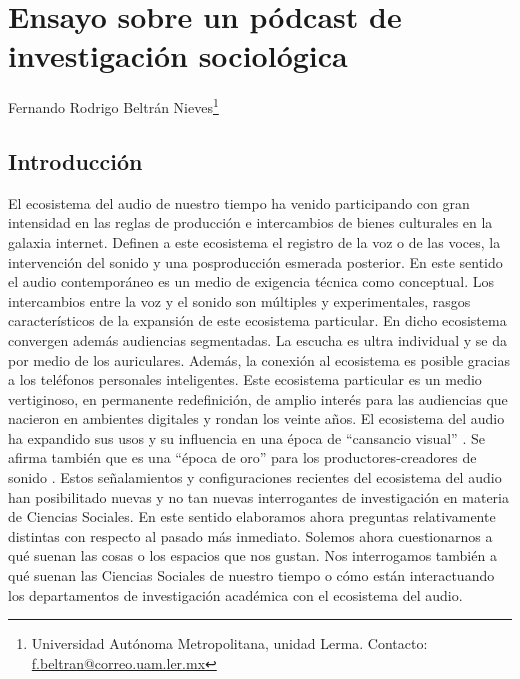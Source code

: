 \documentclass[
  spanish,
  11pt,
  a4paper,
]{scrbook}
\begin{document}
\nocite{Castells1996, RealAcademiaEspanola2014, Bourdieu2009, Bourdieu2011, Becker2019b, Jablonka2022, Ypi2023, Dubet2023}
\printbibliography[heading=subbibliography, title={Referencias Bibliográficas}]

\chapter{Ensayo sobre un pódcast de investigación
sociológica}\label{ensayo-sobre-un-puxf3dcast-de-investigaciuxf3n-socioluxf3gica}


\begin{flushright}
\Large Fernando Rodrigo Beltrán Nieves\footnote{Universidad Autónoma Metropolitana, unidad Lerma. Contacto: \href{f.beltran@correo.uam.ler.mx}{f.beltran@correo.uam.ler.mx}}
\end{flushright}

\section*{Introducción}\label{introducciuxf3n-2}


El ecosistema del audio de nuestro tiempo ha venido participando con
gran intensidad en las reglas de producción e intercambios de bienes
culturales en la galaxia internet. Definen a este ecosistema el registro
de la voz o de las voces, la intervención del sonido y una posproducción
esmerada posterior. En este sentido el audio contemporáneo es un medio
de exigencia técnica como conceptual. Los intercambios entre la voz y el
sonido son múltiples y experimentales, rasgos característicos de la
expansión de este ecosistema particular. En dicho ecosistema convergen
además audiencias segmentadas. La escucha es ultra individual y se da
por medio de los auriculares. Además, la conexión al ecosistema es
posible gracias a los teléfonos personales inteligentes. Este ecosistema
particular es un medio vertiginoso, en permanente redefinición, de
amplio interés para las audiencias que nacieron en ambientes digitales y
rondan los veinte años. El ecosistema del audio ha expandido sus usos y
su influencia en una época de ``cansancio visual''
\autocite{Carrion2020} . Se afirma también que es una ``época de oro''
para los productores-creadores de sonido \autocite{Farra2020}. Estos
señalamientos y configuraciones recientes del ecosistema del audio han
posibilitado nuevas y no tan nuevas interrogantes de investigación en
materia de Ciencias Sociales. En este sentido elaboramos ahora preguntas
relativamente distintas con respecto al pasado más inmediato. Solemos
ahora cuestionarnos a qué suenan las cosas o los espacios que nos
gustan. Nos interrogamos también a qué suenan las Ciencias Sociales de
nuestro tiempo o cómo están interactuando los departamentos de
investigación académica con el ecosistema del audio.
\end{document}
